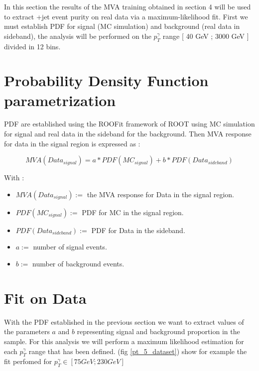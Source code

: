 \label{sec:unchapitre}

In this section the results of the MVA training obtained in section 4 will be used to extract \textgamma+jet event
purity on real data via a maximum-likelihood fit.
First we must establish PDF for signal (MC simulation) and background (real data in sideband), the analysis will be
performed on the $p_T^\gamma$ range [ 40 GeV ; 3000 GeV ] divided in 12 bins.

\section{Probability Density Function parametrization}

PDF are established using the ROOFit framework of ROOT using MC simulation for signal and real data in the sideband for the background.
Then MVA response for data in the signal region is expressed as : 

\begin{equation}
MVA(Data_{signal}) = a*PDF(MC_{signal}) + b*PDF(Data_{sideband})
\end{equation}

With : 
\begin{itemize}
	\item $MVA(Data_{signal}) :=$ the MVA response for Data in the signal region.
	\item $PDF(MC_{signal}) :=$ PDF for MC in the signal region.
	\item $PDF(Data_{sideband}) :=$ PDF for Data in the sideband. 
	\item $a :=$ number of signal events.
	\item $b :=$ number of background events. 
\end{itemize}


\section{Fit on Data}

With the PDF established in the previous section we want to extract values of the parameters $a$ and $b$ representing
signal and background proportion in the sample. For this analysis we will perform a maximum likelihood estimation for
each $p_T^\gamma$ range that has been defined. (fig \ref{pt_5_dataset}) show for example the fit perfomed for
$p_T^\gamma \in [ 75 GeV ; 230 GeV ]$

